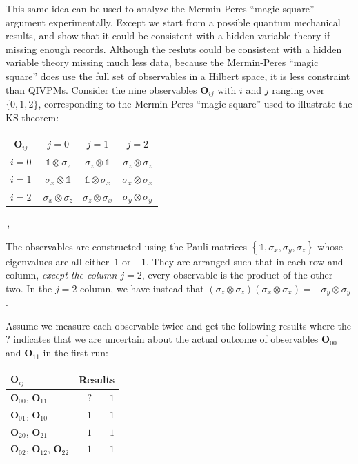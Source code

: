 \documentclass[english,reprint, aps, prl,superscriptaddress, showpacs,
showkeys, longbibliography, amsmath, amssymb, floatfix]{revtex4-1}
\theoremstyle{plain}
\theoremstyle{definition}
\begin{document}
This same idea can be used to analyze the Mermin-Peres ``magic square''
argument experimentally. Except we start from a possible quantum mechanical
results, and show that it could be consistent with a hidden variable
theory if missing enough records. Although the resluts could be consistent
with a hidden variable theory missing much less data, because the
Mermin-Peres ``magic square'' does use the full set of observables
in a Hilbert space, it is less constraint than QIVPMs. Consider the
nine observables $\mathbf{O}_{ij}$ with $i$ and $j$ ranging over
$\{0,1,2\}$, corresponding to the Mermin-Peres ``magic square''
used to illustrate the KS theorem:


{\renewcommand{\arraystretch}{2}%
\begin{center} 
\begin{tabular}{r|@{\quad}c@{\quad}|@{\quad}c@{\quad}|@{\quad}c@{\quad}|} 
$\mathbf{O}_{ij}$~ & $j=0$ & $j=1$ & $j=2$ \\ 
\hline  
$i=0~$ & $\mathbb{1}\otimes\sigma_{z}$  & $\sigma_{z}\otimes\mathbb{1}$  & $\sigma_{z}\otimes\sigma_{z}$ \tabularnewline 
\hline  
$i=1~$ & $\sigma_{x}\otimes\mathbb{1}$  & $\mathbb{1}\otimes\sigma_{x}$  & $\sigma_{x}\otimes\sigma_{x}$ \tabularnewline 
\hline  
$i=2~$ & $\sigma_{x}\otimes\sigma_{z}$  & $\sigma_{z}\otimes\sigma_{x}$  & $\sigma_{y}\otimes\sigma_{y}$ \tabularnewline 
\hline  
\end{tabular}\,,
\par\end{center} 
}

\noindent The observables are constructed using the Pauli matrices
$\left\{ \mathbb{1},\sigma_{x},\sigma_{y},\sigma_{z}\right\} $ whose
eigenvalues are all either~$1$ or $-1$. They are arranged such
that in each row and column, \emph{except the column $j=2$}, every
observable is the product of the other two. In the $j=2$ column,
we have instead that $\left(\sigma_{z}\otimes\sigma_{z}\right)\left(\sigma_{x}\otimes\sigma_{x}\right)=-\sigma_{y}\otimes\sigma_{y}$. 

Assume we measure each observable twice and get the following results
where the ? indicates that we are uncertain about the actual outcome
of observables $\mathbf{O}_{00}$ and $\mathbf{O}_{11}$ in the first run:
\begin{center}
\begin{tabular}{l@{\qquad}r@{\qquad}r}
\toprule 
\addlinespace
$\mathbf{O}_{ij}$  & \multicolumn{2}{c}{Results} \\
\midrule
\midrule 
\addlinespace
$\mathbf{O}_{00}$, $\mathbf{O}_{11}$ & $?$  & $-1$  \\
\midrule 
\addlinespace
$\mathbf{O}_{01}$, $\mathbf{O}_{10}$ & $-1$  & $-1$  \\
\midrule 
\addlinespace
$\mathbf{O}_{20}$, $\mathbf{O}_{21}$ & $1$  & $1$  \\
\midrule 
\addlinespace
$\mathbf{O}_{02}$, $\mathbf{O}_{12}$, $\mathbf{O}_{22}$ & $1$  & $1$  \\
\bottomrule
\end{tabular}
\par\end{center}
\end{document}
